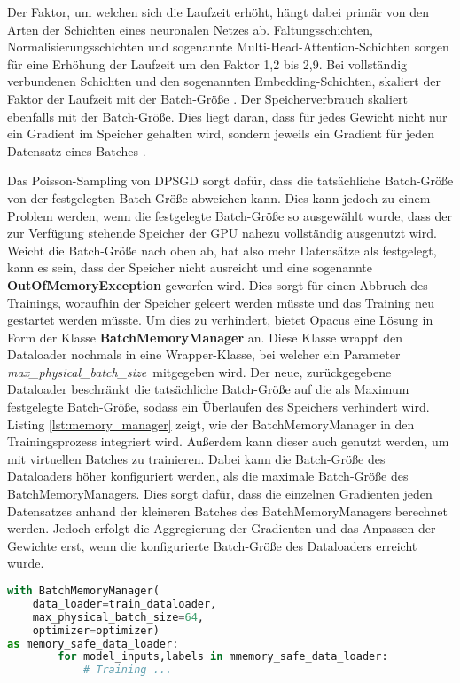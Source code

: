 Der Faktor, um welchen sich die Laufzeit erhöht, hängt dabei primär von den Arten der Schichten eines neuronalen Netzes ab. 
Faltungsschichten, Normalisierungsschichten und sogenannte Multi-Head-Attention-Schichten sorgen für eine Erhöhung der Laufzeit um den Faktor 1,2 bis 2,9.
Bei vollständig verbundenen Schichten und den sogenannten Embedding-Schichten\mbox, skaliert der Faktor der Laufzeit mit der Batch-Größe \cite{opacus}.
Der Speicherverbrauch skaliert ebenfalls mit der Batch-Größe.
Dies liegt daran, dass für jedes Gewicht nicht nur ein Gradient im Speicher gehalten wird, sondern jeweils ein Gradient für jeden Datensatz eines Batches \cite{opacus}.

Das Poisson-Sampling von DPSGD sorgt dafür, dass die tatsächliche Batch-Größe von der festgelegten Batch-Größe abweichen kann. 
Dies kann jedoch zu einem Problem werden, wenn die festgelegte Batch-Größe so ausgewählt wurde, dass der zur Verfügung stehende Speicher der GPU nahezu vollständig ausgenutzt wird.
Weicht die Batch-Größe nach oben ab, hat also mehr Datensätze als festgelegt, kann es sein, dass der Speicher nicht ausreicht und eine sogenannte \textbf{OutOfMemoryException} geworfen wird.
Dies sorgt für einen Abbruch des Trainings, woraufhin der Speicher geleert werden müsste und das Training neu gestartet werden müsste.
Um dies zu verhindert, bietet Opacus eine Lösung in Form der Klasse \textbf{BatchMemoryManager} an.
Diese Klasse wrappt den Dataloader nochmals in eine Wrapper-Klasse, bei welcher ein Parameter \dq \textit{max\_physical\_batch\_size}\dq\ mitgegeben wird. 
Der neue, zurückgegebene Dataloader beschränkt die tatsächliche Batch-Größe auf die als Maximum festgelegte Batch-Größe, sodass ein Überlaufen des Speichers verhindert wird.
Listing \ref{lst:memory_manager} zeigt, wie der BatchMemoryManager in den Trainingsprozess integriert wird.
Außerdem kann dieser auch genutzt werden, um mit virtuellen Batches zu trainieren. 
Dabei kann die Batch-Größe des Dataloaders höher konfiguriert werden, als die maximale Batch-Größe des BatchMemoryManagers. 
Dies sorgt dafür, dass die einzelnen Gradienten jeden Datensatzes anhand der kleineren Batches des BatchMemoryManagers berechnet werden.
Jedoch erfolgt die Aggregierung der Gradienten und das Anpassen der Gewichte erst, wenn die konfigurierte Batch-Größe des Dataloaders erreicht wurde.

\begin{lstlisting}[language=Python,caption={Opacus BatchMemoryManager},captionpos=b,showstringspaces=false,label={lst:memory_manager}]
with BatchMemoryManager( 
    data_loader=train_dataloader,
    max_physical_batch_size=64,
    optimizer=optimizer) 
as memory_safe_data_loader:
        for model_inputs,labels in mmemory_safe_data_loader:
            # Training ...
\end{lstlisting}


